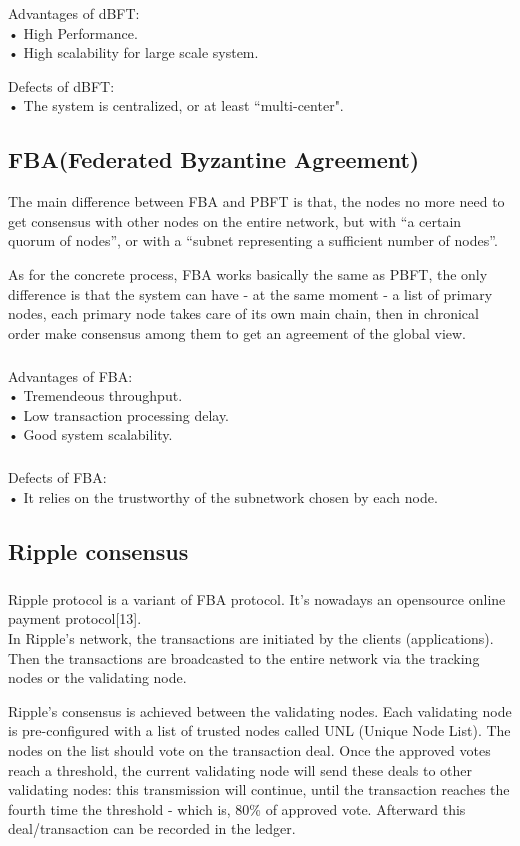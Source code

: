 \documentclass[doublespacing]{bmcart}
\begin{document}
\begin{CJK*}{UTF8}{gbsn}
	 
Advantages of dBFT:
\\• High Performance.
\\• High scalability for large scale system.
	 
Defects of dBFT:	
\\• The system is centralized, or at least ``multi-center".
	
	\subsection{FBA(Federated Byzantine Agreement)}
	 
	The main difference between FBA and PBFT is that, the nodes no more need to get consensus with other nodes on the entire network, but with ``a certain quorum of nodes'', or with a ``subnet representing a sufficient number of nodes''.
	
	 
	As for the concrete process, FBA works basically the same as PBFT, the only difference is that the system can have - at the same moment - a list of primary nodes, each primary node takes care of its own main chain, then in chronical order make consensus among them to get an agreement of the global view.
	
	\subparagraph{} 
Advantages of FBA:
\\• Tremendeous throughput.
\\• Low transaction processing delay.
\\• Good system scalability.
	\subparagraph{} 
Defects of FBA:	
\\• It relies on the trustworthy of the subnetwork chosen by each node.
	
	\subsection{Ripple consensus}
	\subparagraph{}  
	Ripple protocol is a variant of FBA protocol. It's nowadays an opensource online payment protocol[13].
	\\
	In Ripple's network, the transactions are initiated by the clients (applications). Then the transactions are broadcasted to the entire network via the tracking nodes or the validating node.

Ripple's consensus is achieved between the validating nodes. Each validating node is pre-configured with a list of trusted nodes called UNL (Unique Node List). The nodes on the list should vote on the transaction deal. Once the approved votes reach a threshold, the current validating node will send these deals to other validating nodes: this transmission will continue, until the transaction reaches the fourth time the threshold - which is, 80\% of approved vote. Afterward this deal/transaction can be recorded in the ledger.
	

\end{CJK*}
\end{document}
